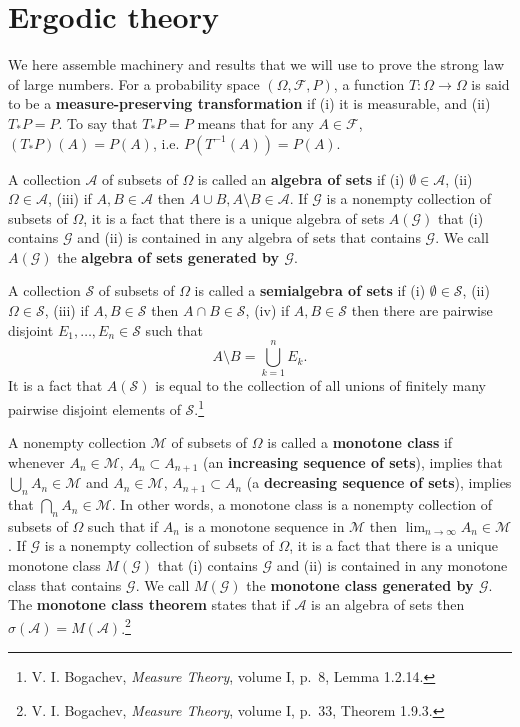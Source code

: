 \documentclass{article}
\theoremstyle{definition}
\begin{document}
\section{Ergodic theory}
We here assemble 
machinery and results that we will use to prove the strong law of large numbers. For a probability
space $(\Omega,\mathscr{F},P)$, a function $T:\Omega \to \Omega$ is said to be a \textbf{measure-preserving transformation} if
(i) it is measurable, and (ii) $T_*P=P$. To say that $T_*P=P$ means that for any $A \in \mathscr{F}$,
$(T_*P)(A)=P(A)$, i.e. $P(T^{-1}(A))=P(A)$. 

A collection $\mathscr{A}$ of subsets of $\Omega$ is called an \textbf{algebra of sets} if
(i) $\emptyset \in \mathscr{A}$, (ii) $\Omega \in \mathscr{A}$, (iii) if $A,B \in \mathscr{A}$ then
$A \cup B, A \setminus B \in \mathscr{A}$. If $\mathscr{G}$ is a nonempty collection of subsets of $\Omega$, it is a fact that there is a unique
algebra of sets $A(\mathscr{G})$ that (i) contains $\mathscr{G}$ and (ii) is contained in any algebra of sets that contains $\mathscr{G}$. We call
$A(\mathscr{G})$ the \textbf{algebra of sets generated by $\mathscr{G}$}.


A collection $\mathscr{S}$ of subsets of $\Omega$ is called a \textbf{semialgebra of sets} if
(i) $\emptyset \in \mathscr{S}$, (ii) $\Omega \in \mathscr{S}$, (iii) if $A,B \in \mathscr{S}$ then $A \cap B \in \mathscr{S}$,
(iv) if $A,B \in \mathscr{S}$ then there are pairwise disjoint $E_1,\ldots,E_n \in \mathscr{S}$ such that
\[
A \setminus B = \bigcup_{k=1}^n E_k.
\] 
It is a fact that $A(\mathscr{S})$ is equal to the collection of all unions of finitely many pairwise disjoint
elements of $\mathscr{S}$.\footnote{V. I. Bogachev, {\em Measure Theory}, volume I, p.~8,
Lemma 1.2.14.}


A nonempty collection $\mathscr{M}$ of subsets of $\Omega$ is called a
\textbf{monotone class} if whenever $A_n \in \mathscr{M}$, $A_n \subset A_{n+1}$ (an \textbf{increasing sequence
of sets}), implies
that $\bigcup_n A_n \in \mathscr{M}$ and
$A_n \in \mathscr{M}$, $A_{n+1} \subset A_n$ (a \textbf{decreasing sequence of sets}),
implies that $\bigcap_n A_n \in \mathscr{M}$.
In other words, a monotone class is a nonempty collection of subsets of $\Omega$ such that
if $A_n$ is a monotone sequence in $\mathscr{M}$ then $\lim_{n \to \infty} A_n \in \mathscr{M}$.
If $\mathscr{G}$ is a nonempty collection of subsets of $\Omega$, it is a fact that there is a unique
monotone class $M(\mathscr{G})$ that (i) contains $\mathscr{G}$ and (ii) is contained in any monotone class that contains $\mathscr{G}$. We call
$M(\mathscr{G})$ the \textbf{monotone class generated by $\mathscr{G}$}.
The \textbf{monotone class theorem} states that if $\mathscr{A}$ is an algebra of sets then 
$\sigma(\mathscr{A})=M(\mathscr{A})$.\footnote{V. I. Bogachev, {\em Measure Theory}, volume I, p.~33,
Theorem 1.9.3.}
\end{document}
